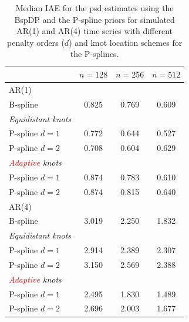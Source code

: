 \documentclass[twocolumn,final]{svjour3}
\begin{document}
\def\arraystretch{1.1}
\begin{table}
	\centering
		\begin{tabular}{lccc}
			\toprule
			& $n=128$ & $n=256$ & $n=512$ \\ \hline
			AR(1)     &  &  &  \\ 
			B-spline &  0.825 & 0.769 & 0.609  \\
			\textit{Equidistant knots}& & &   \\
			\hspace{0.5em}P-spline $d=1$ &  0.772 & 0.644 & 0.527 \\
			\hspace{0.5em}P-spline $d=2$&  0.708 & 0.604 & 0.629 \\
			\textit{\textcolor{red}{Adaptive} knots}& & &   \\
			\hspace{0.5em}P-spline $d=1$ & 0.874 & 0.783 & 0.610 \\
			\hspace{0.5em}P-spline $d=2$ & 0.874 & 0.815 & 0.640 \\ \hline
			AR(4)     &  &  &  \\ 
			B-spline & 3.019 & 2.250 & 1.832   \\
			\textit{Equidistant knots}& & &   \\
			\hspace{0.5em}P-spline $d=1$ &  2.914 & 2.389 & 2.307\\
			\hspace{0.5em}P-spline $d=2$&  3.150 & 2.569 & 2.388\\
			\textit{\textcolor{red}{Adaptive} knots}& & &   \\
			\hspace{0.5em}P-spline $d=1$ & 2.495 & 1.830 & 1.489\\
			\hspace{0.5em}P-spline $d=2$ &  2.696 & 2.003 & 1.677\\
			\bottomrule
		\end{tabular}
	\caption{Median IAE for the psd estimates using the BspDP and the P-spline priors for simulated AR(1) and AR(4) time series with  different penalty orders ($d$) and knot location schemes for the P-splines.}
	\label{table:sim_IAE}
\end{table}
\end{document}
